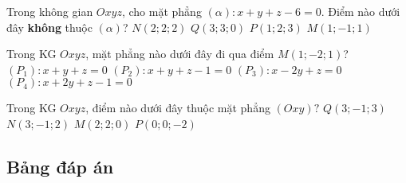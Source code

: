 \begin{ex}%
	Trong không gian  $Oxyz$, cho mặt phẳng $(\alpha):x+y+z-6=0$. Điểm nào dưới đây \textbf{không} thuộc $(\alpha)$?
	\choice
	{$N(2;2;2)$}
	{$Q(3;3;0)$}
	{$P(1;2;3)$}
	{\True $M(1;-1;1)$}
\end{ex}

\begin{ex}%
	Trong KG $Oxyz$, mặt phẳng nào dưới đây đi qua điểm $M(1;-2;1)$?
	\choice
	{\True $\left(P_1\right)\colon x+y+z=0$}	
	{$\left(P_2\right)\colon x+y+z-1=0$}
	{$\left(P_3\right)\colon x-2y+z=0$}
	{$\left(P_4\right)\colon x+2y+z-1=0$}
\end{ex}

\begin{ex}%
	Trong KG $Oxyz$, điểm nào dưới đây thuộc mặt phẳng $(Oxy)?$
	\choice
	{$Q(3;-1;3)$}
	{$N(3;-1;2)$}
	{\True $M(2;2;0)$}
	{$P(0;0;-2)$}
\end{ex}
\subsection{Bảng đáp án}
